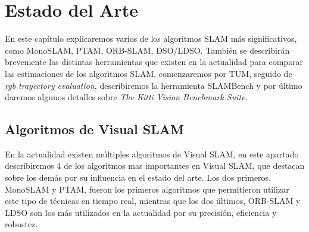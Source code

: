 \chapter{Estado del Arte} \label{cap:Estado del Arte} %

En este capítulo explicaremos varios de los algoritmos SLAM más significativos, como MonoSLAM, PTAM, ORB-SLAM, DSO/LDSO.
También se describirán brevemente las distintas herramientas que existen en la actualidad para comparar las estimaciones de los algoritmos SLAM, comenzaremos por TUM, seguido de \textit{rgb trayectory evaluation}, describiremos la herramienta SLAMBench y por último daremos algunos detalles sobre \textit{The Kitti Vision Benchmark Suite}.

\section{Algoritmos de Visual SLAM}
En la actualidad existen múltiples algoritmos de Visual SLAM, en este apartado describiremos 4 de los algoritmos mas importantes en Visual SLAM, que destacan sobre los demás por su influencia en el estado del arte. Los dos primeros, MonoSLAM y PTAM, fueron los primeros algoritmos que permitieron utilizar este tipo de técnicas en tiempo real, mientras que los dos últimos, ORB-SLAM y LDSO son los más utilizados en la actualidad por su precisión, eficiencia y robustez.


